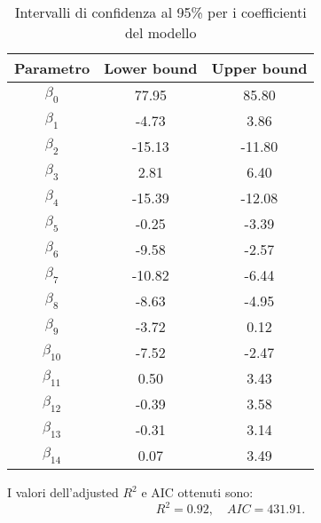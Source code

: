 \begin{table}[H]
	\centering
	\begin{tabular}{|c|c|c|}
		\hline
		\textbf{Parametro} & \textbf{Lower bound} & \textbf{Upper bound} \\
		\hline
		$\beta_0$   & 77.95  & 85.80 \\
		$\beta_1$   & -4.73 & 3.86 \\
		$\beta_2$   & -15.13 & -11.80 \\
		$\beta_3$   & 2.81   & 6.40 \\
		$\beta_4$   & -15.39  & -12.08 \\
		$\beta_5$   & -0.25 & -3.39 \\
		$\beta_6$   & -9.58  & -2.57 \\
		$\beta_7$   & -10.82  & -6.44 \\
		$\beta_8$   & -8.63 & -4.95 \\
		$\beta_9$   & -3.72  & 0.12 \\
		$\beta_{10}$ & -7.52  & -2.47 \\
		$\beta_{11}$ & 0.50  & 3.43 \\
		$\beta_{12}$ & -0.39  & 3.58 \\
		$\beta_{13}$ & -0.31  & 3.14 \\
		$\beta_{14}$ & 0.07  & 3.49 \\
		\hline
	\end{tabular}
	\caption{Intervalli di confidenza al 95\% per i coefficienti del modello}
	\label{tab:ci_coefficienti}
\end{table}
I valori dell'adjusted $R^2$  e AIC ottenuti sono:
\begin{equation*}
	R^2 =      0.92, \quad AIC=431.91.
\end{equation*}